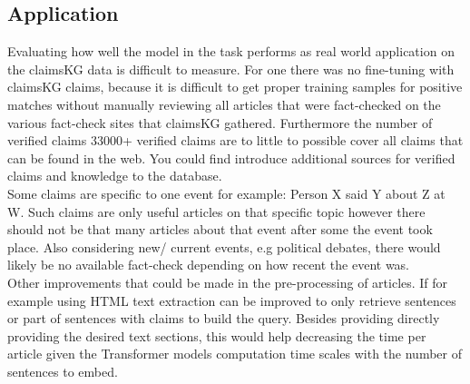 \documentclass{article}
\begin{document}
\subsection{Application}
Evaluating how well the model in the task performs as real world application on the claimsKG data is difficult to measure.
For one there was no fine-tuning with claimsKG claims, because it is difficult to get proper training samples for positive matches without manually reviewing all articles that were fact-checked on the various fact-check sites that claimsKG gathered. 
Furthermore the number of verified claims 33000+ verified claims are to little to possible cover all claims that can be found in the web.
You could find introduce additional sources for verified claims and knowledge to the database.\\
Some claims are specific to one event for example: Person X said Y about Z at W. 
Such claims are only useful articles on that specific topic however there should not be that many articles about that event after some the event took place.
Also considering new/ current events, e.g political debates, there would likely be no available fact-check depending on how recent the event was.\\
Other improvements that could be made in the pre-processing of articles.
If for example using HTML text extraction can be improved to only retrieve sentences or part of sentences with claims to build the query. 
Besides providing directly providing the desired text sections, this would help decreasing the time per article given the Transformer models computation time scales with the number of sentences to embed.


\end{document}

